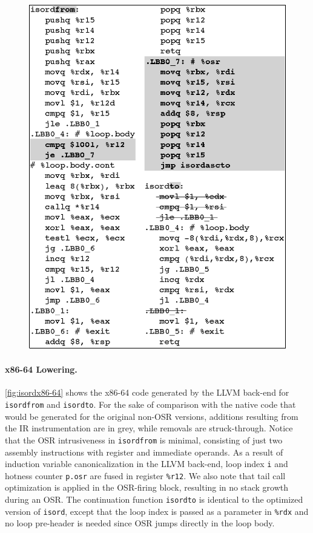 \ifdefined\noauthorea
\begin{figure}[t]
\begin{center}
\includegraphics[width=0.9\columnwidth]{figures/isordx86-64/isordx86-64.eps}
\caption{\protect}
\end{center}
\end{figure}
\fi

\paragraph{x86-64 Lowering.}
\label{se:ir-x86-lowering}

\myfigure\ref{fig:isordx86-64} shows the x86-64 code generated by the LLVM back-end for {\tt isordfrom} and {\tt isordto}. For the sake of comparison with the native code that would be generated for the original non-OSR versions, additions resulting from the IR instrumentation are in grey, while removals are struck-through. Notice that the OSR intrusiveness in {\tt isordfrom} is minimal, consisting of just two assembly instructions with register and immediate operands. As a result of induction variable canonicalization in the LLVM back-end, loop index {\tt i} and hotness counter {\tt p.osr} are fused in register {\tt\%r12}. We also note that tail call optimization is applied in the OSR-firing block, resulting in no stack growth during an OSR. The continuation function {\tt isordto} is identical to the optimized version of {\tt isord}, except that the loop index is passed as a parameter in {\tt \%rdx} and no loop pre-header is needed since OSR jumps directly in the loop body.

